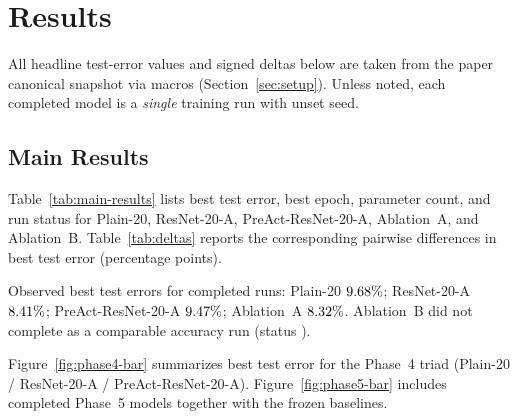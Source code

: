 \section{Results}
\label{sec:results}


All headline test-error values and signed deltas below are taken from the paper canonical
snapshot via macros (Section~\ref{sec:setup}).
Unless noted, each completed model is a \emph{single} training run with unset seed.

\subsection{Main Results}
\label{sec:results-main}

Table~\ref{tab:main-results} lists best test error, best epoch, parameter count, and run status
for Plain-20, ResNet-20-A, PreAct-ResNet-20-A, Ablation~A, and Ablation~B.
Table~\ref{tab:deltas} reports the corresponding pairwise differences in best test error
(percentage points).

\begin{table}[t]
  \caption{Main CIFAR-10 results (best test error). Numbers are from the canonical snapshot.
  Ablation~B has no comparable best test error.}
  \label{tab:main-results}
  \centering
  \small
  
\end{table}

\begin{table}[t]
  \caption{Pairwise differences in best test error (percentage points; canonical deltas).}
  \label{tab:deltas}
  \centering
  \small
  
\end{table}

Observed best test errors for completed runs:
Plain-20 $9.68\%$;
ResNet-20-A $8.41\%$;
PreAct-ResNet-20-A $9.47\%$;
Ablation~A $8.32\%$.
Ablation~B did not complete as a comparable accuracy run
(status \AblationBStatus).

Figure~\ref{fig:phase4-bar} summarizes best test error for the Phase~4 triad
(Plain-20 / ResNet-20-A / PreAct-ResNet-20-A).
Figure~\ref{fig:phase5-bar} includes completed Phase~5 models together with the frozen baselines.


